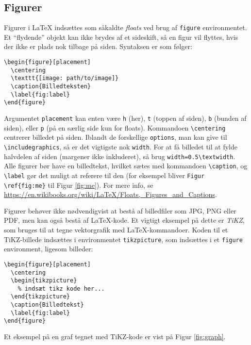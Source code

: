 \subsection{Figurer}
\label{sec:figures}

Figurer i \LaTeX{} indsættes som såkaldte \emph{floats} ved brug af \texttt{figure} environmentet.
Et ``flydende'' objekt kan ikke brydes af et sideskift, så en figur vil flyttes, hvis der ikke er plads nok tilbage på siden.
Syntaksen er som følger:
%
\begin{verbatim}
\begin{figure}[placement]
  \centering
  \texttt{[image: path/to/image]}
  \caption{Billedteksten}
  \label{fig:label}
\end{figure}
\end{verbatim}
%
Argumentet \texttt{placement} kan enten være \texttt{h} (her), \texttt{t} (toppen af siden), \texttt{b} (bunden af siden), eller \texttt{p} (på en særlig side kun for floats).
Kommandoen \verb!\centering! centrerer billedet på siden.
Iblandt de forskellige \texttt{options}, man kan give til \verb!\includegraphics!, så er det vigtigste nok \texttt{width}.
For at få billedet til at fylde halvdelen af siden (margener ikke inkluderet), så brug \verb!width=0.5\textwidth!.
Alle figurer bør have en billedtekst, hvilket sætes med kommandoen \verb!\caption!, og \verb!\label! gør det muligt at referere til den (for eksempel bliver \verb!Figur \ref{fig:me}! til Figur \ref{fig:me}).
For mere info, se \url{https://en.wikibooks.org/wiki/LaTeX/Floats,_Figures_and_Captions}.



Figurer behøver ikke nødvendigvist at bestå af billedfiler som JPG, PNG eller PDF, men kan også bestå af \LaTeX{}-kode.
Et vigtigt eksempel på dette er \emph{TiKZ}, som bruges til at tegne vektorgrafik med \LaTeX{}-kommandoer.
Koden til et TiKZ-billede indsættes i environmentet \texttt{tikzpicture}, som indsættes i et \texttt{figure} environment, ligesom billeder:
%
\begin{verbatim}
\begin{figure}[placement]
  \centering
  \begin{tikzpicture}
    % indsæt tikz kode her...
  \end{tikzpicture}
  \caption{Billedtekst}
  \label{fig:label}
\end{figure}
\end{verbatim}
%
Et eksempel på en graf tegnet med TiKZ-kode er vist på Figur \ref{fig:graph}.

